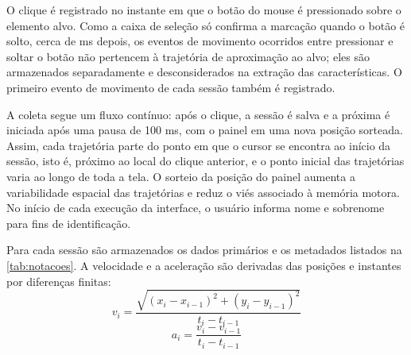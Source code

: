 O clique é registrado no instante em que o botão do mouse é pressionado sobre o elemento alvo. Como a caixa de seleção só confirma a marcação quando o botão é solto, cerca de  ms depois, os eventos de movimento ocorridos entre pressionar e soltar o botão não pertencem à trajetória de aproximação ao alvo; eles são armazenados separadamente e desconsiderados na extração das características. O primeiro evento de movimento de cada sessão também é registrado.

A coleta segue um fluxo contínuo: após o clique, a sessão é salva e a próxima é iniciada após uma pausa de 100 ms, com o painel em uma nova posição sorteada. Assim, cada trajetória parte do ponto em que o cursor se encontra ao início da sessão, isto é, próximo ao local do clique anterior, e o ponto inicial das trajetórias varia ao longo de toda a tela. O sorteio da posição do painel aumenta a variabilidade espacial das trajetórias e reduz o viés associado à memória motora. No início de cada execução da interface, o usuário informa nome e sobrenome para fins de identificação.

Para cada sessão são armazenados os dados primários e os metadados listados na \autoref{tab:notacoes}. A velocidade e a aceleração são derivadas das posições e instantes por diferenças finitas:
\begin{equation}
    v_i = \frac{\sqrt{(x_i - x_{i-1})^2 + (y_i - y_{i-1})^2}}{t_i - t_{i-1}}
    \label{eq:velocidade}
\end{equation}
\begin{equation}
    a_i = \frac{v_i - v_{i-1}}{t_i - t_{i-1}}
    \label{eq:aceleracao}
\end{equation}

